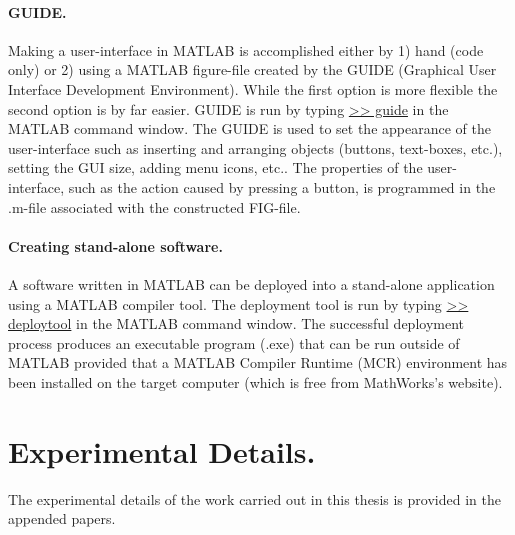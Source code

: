  \paragraph{GUIDE.} Making a user-interface in MATLAB is accomplished either by 1) hand (code only) or 2) using a MATLAB figure-file created by the GUIDE (Graphical User Interface Development Environment). While the first option is more flexible the second option is by far easier. GUIDE is run by typing \url{>> guide} in the MATLAB command window. The GUIDE is used to set the appearance of the user-interface such as inserting and arranging objects (buttons, text-boxes, etc.), setting the GUI size, adding menu icons, etc.. The properties of the user-interface, such as the action caused by pressing a button, is programmed in the .m-file associated with the constructed FIG-file.

 \paragraph{Creating stand-alone software.} A software written in MATLAB can be deployed into a stand-alone application using a MATLAB compiler tool. The deployment tool is run by typing \url{>> deploytool} in the MATLAB command window. The successful deployment process produces an executable program (.exe) that can be run outside of MATLAB provided that a MATLAB Compiler Runtime (MCR) environment has been installed on the target computer (which is free from MathWorks's website).

\section{Experimental Details.}
 The experimental details of the work carried out in this thesis is provided in the appended papers.
